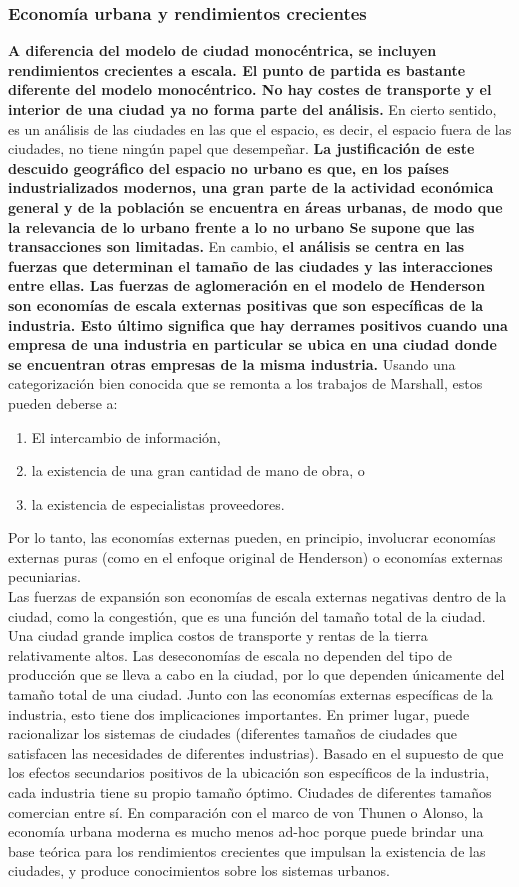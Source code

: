 \subsubsection{Economía urbana y rendimientos crecientes}
\textbf{A diferencia del modelo de ciudad monocéntrica, se incluyen rendimientos crecientes a escala. El punto de partida es bastante diferente del modelo monocéntrico. No hay costes de transporte y el interior de una ciudad ya no forma parte del análisis.} En cierto sentido, es un análisis de las ciudades en las que el espacio, es decir, el espacio fuera de las ciudades, no tiene ningún papel que desempeñar. \textbf{La justificación de este descuido geográfico del espacio no urbano es que, en los países industrializados modernos, una gran parte de la actividad económica general y de la población se encuentra en áreas urbanas, de modo que la relevancia de lo urbano frente a lo no urbano Se supone que las transacciones son limitadas.} En cambio, \textbf{el análisis se centra en las fuerzas que determinan el tamaño de las ciudades y las interacciones entre ellas. Las fuerzas de aglomeración en el modelo de Henderson son economías de escala externas positivas que son específicas de la industria. Esto último significa que hay derrames positivos cuando una empresa de una industria en particular se ubica en una ciudad donde se encuentran otras empresas de la misma industria.} Usando una categorización bien conocida que se remonta a los trabajos de Marshall, estos pueden deberse a:
\begin{enumerate}[\bfseries (i)]
    \item El intercambio de información, 
    \item la existencia de una gran cantidad de mano de obra, o
    \item la existencia de especialistas proveedores.
\end{enumerate}
Por lo tanto, las economías externas pueden, en principio, involucrar economías externas puras (como en el enfoque original de Henderson) o economías externas pecuniarias. \\
Las fuerzas de expansión son economías de escala externas negativas dentro de la ciudad, como la congestión, que es una función del tamaño total de la ciudad. Una ciudad grande implica costos de transporte y rentas de la tierra relativamente altos. Las deseconomías de escala no dependen del tipo de producción que se lleva a cabo en la ciudad, por lo que dependen únicamente del tamaño total de una ciudad. Junto con las economías externas específicas de la industria, esto tiene dos implicaciones importantes. En primer lugar, puede racionalizar los sistemas de ciudades (diferentes tamaños de ciudades que satisfacen las necesidades de diferentes industrias). Basado en el supuesto de que los efectos secundarios positivos de la ubicación son específicos de la industria, cada industria tiene su propio tamaño óptimo. Ciudades de diferentes tamaños comercian entre sí. En comparación con el marco de von Thunen o Alonso, la economía urbana moderna es mucho menos ad-hoc porque puede brindar una base teórica para los rendimientos crecientes que impulsan la existencia de las ciudades, y produce conocimientos sobre los sistemas urbanos. 

